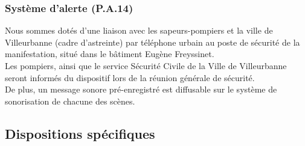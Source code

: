 \documentclass[hidelinks, paper=a4, fontsize=13pt]{report}
\begin{document}
\subsubsection{Système d'alerte  (P.A.14)}
\label{systemeAlerteIncendie}

Nous sommes dotés d’une liaison avec les sapeurs-pompiers et la ville de Villeurbanne (cadre d’astreinte) par téléphone urbain au poste de sécurité de la manifestation, situé dans le bâtiment Eugène Freyssinet. \\

Les pompiers, ainsi que le service Sécurité Civile de la Ville de Villeurbanne seront informés du dispositif lors de la réunion générale de sécurité. \\

De plus, un message sonore pré-enregistré est diffusable sur le système de sonorisation de chacune des scènes.

\subsection{Dispositions spécifiques}
\end{document}
